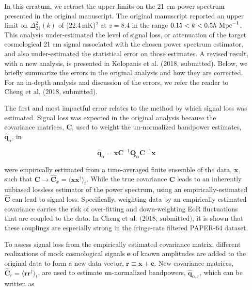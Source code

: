 \documentclass[onecolumn]{emulateapj} \shorttitle{}
\newcommand{\hMpci}{h\ {\rm Mpc}^{-1}}
\newcommand{\mKlimit}{(22.4\,\textrm{mK})$^2$ }
\newcommand{\kolopaniscitet}{\textrm{Kolopanis et al. (2018, submitted)}}
\newcommand{\chengcitet}{\textrm{Cheng et al. (2018, submitted)}}
\begin{document}
\maketitle

In this erratum, we retract the upper limits on the 21 cm power spectrum
presented in the original manuscript.  The original manuscript reported an upper
limit on $\Delta_{21}^2(k)$ of \mKlimit at $z=8.4$ in the range
$0.15<k<0.5\hMpci$.  This analysis under-estimated the level of signal loss, or attenuation of
the target cosmological 21 cm signal associated with the chosen power spectrum
estimator, and also under-estimated the statistical error on those estimates.
A revised result, with a new analysis, is presented in \kolopaniscitet.  Below,
we briefly summarize the errors in the original analysis and how they are
corrected. For an in-depth analysis and discussion of the errors, we refer the reader to
\chengcitet.

The first and most impactful error relates to the method by which signal loss
was estimated. Signal loss was expected in the original analysis because the
covariance matrices, $\textbf{C}$, used to weight the un-normalized bandpower
estimates, ${\widehat{\textbf{q}}}_\alpha$, in

\begin{equation}
{\widehat{\textbf{q}}}_{\alpha} = {\mathbf x}\textbf{C}^{-1}\textbf{Q}_\alpha \textbf{C}^{-1}{\mathbf x}
\end{equation} 

\noindent were empirically estimated from a time-averaged finite ensemble of the data,
$\mathbf x$, such that $\mathbf{C}\rightarrow \widehat{\textbf{C}}_{x}=\langle {\mathbf x} {\mathbf x}^\dagger\rangle_{t}$.
While the true covariance $\textbf{C}$ leads to an inherently unbiased lossless estimator of the power spectrum, using an empirically-estimated $\widehat{\textbf{C}}$ can lead to signal loss. Specifically, weighting data by an empirically estimated covariance carries the risk of over-fitting and down-weighting EoR fluctuations that are coupled to the data. In $\chengcitet$, it is shown that these couplings are especially strong in the fringe-rate filtered PAPER-64 dataset.

To assess signal loss from the empirically estimated covariance matrix, different realizations of mock
cosmological signals $\mathbf e$ of known amplitudes are added to the original data to form a new data vector, 
${\mathbf r}\equiv{\mathbf x} + {\mathbf e}$.
New covariance matrices, 
$\widehat{\textbf{C}}_r=\langle{\mathbf r}\mathbf{r}^\dagger\rangle_{t}$, 
are used to estimate un-normalized bandpowers, 
${\widehat{\textbf{q}}}_{\alpha,r}$, which can be written as 
\end{document}
